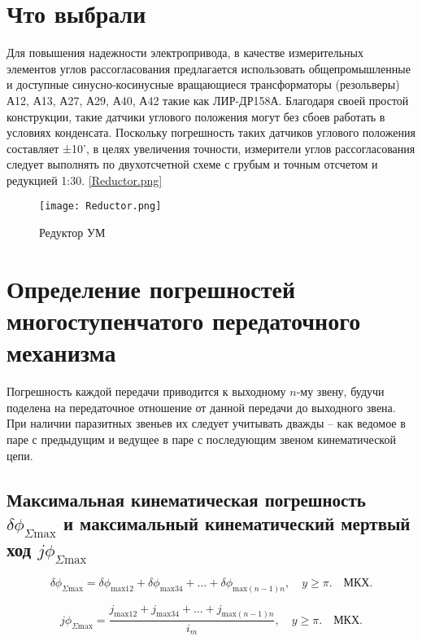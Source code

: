 \section{Что выбрали}

Для повышения надежности электропривода, в качестве измерительных элементов углов рассогласования предлагается использовать общепромышленные и доступные 
синусно-косинусные вращающиеся трансформаторы (резольверы) А12, А13, А27, А29, А40, А42 такие как ЛИР-ДР158А. Благодаря своей простой конструкции, 
такие датчики углового положения могут без сбоев работать в условиях конденсата. Поскольку погрешность таких датчиков углового положения составляет ±10', 
в целях увеличения точности, измерители углов рассогласования следует выполнять по двухотсчетной схеме с грубым и точным отсчетом и редукцией 1:30. \ref{Reductor.png} 

  \begin{figure}[!t]
    \centering
    \texttt{[image: Reductor.png]}
    \caption{Редуктор УМ}
    \label{Reductor}
  \end{figure}

\section*{Определение погрешностей многоступенчатого передаточного механизма}

Погрешность каждой передачи приводится к выходному $n$-му звену, будучи поделена на передаточное отношение от данной передачи до выходного звена. При наличии паразитных звеньев их следует учитывать дважды -- как ведомое в паре с предыдущим и ведущее в паре с последующим звеном кинематической цепи.

\subsection*{Максимальная кинематическая погрешность $\delta\phi_{\Sigma \text{max}}$ и максимальный кинематический мертвый ход $j\phi_{\Sigma \text{max}}$}

\begin{equation}
    \delta\phi_{\Sigma \text{max}} = \delta\phi_{\text{max}12} + \delta\phi_{\text{max}34} + \dots + \delta\phi_{\text{max}(n-1)n}, \quad y \geq \pi. \quad \text{МКХ.} \tag{6.53}
\end{equation}

\begin{equation}
    j\phi_{\Sigma \text{max}} = \frac{j_{\text{max}12} + j_{\text{max}34} + \dots + j_{\text{max}(n-1)n}}{i_m}, \quad y \geq \pi. \quad \text{МКХ.} \tag{6.54}
\end{equation}

